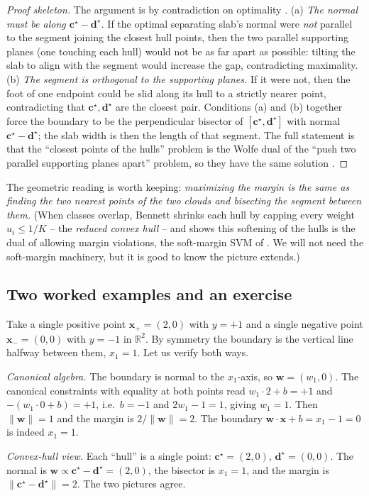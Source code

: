 \begin{proof}[Proof skeleton]
The argument is by contradiction on optimality
\citep{bennett2000}. (a) \emph{The normal must be along
$\mathbf{c}^\star-\mathbf{d}^\star$.} If the optimal separating slab's
normal were \emph{not} parallel to the segment joining the closest hull
points, then the two parallel supporting planes (one touching each hull)
would not be as far apart as possible: tilting the slab to align with the
segment would increase the gap, contradicting maximality. (b) \emph{The
segment is orthogonal to the supporting planes.} If it were not, then the
foot of one endpoint could be slid along its hull to a strictly nearer
point, contradicting that $\mathbf{c}^\star,\mathbf{d}^\star$ are the
closest pair. Conditions (a) and (b) together force the boundary to be the
perpendicular bisector of $[\mathbf{c}^\star,\mathbf{d}^\star]$ with normal
$\mathbf{c}^\star-\mathbf{d}^\star$; the slab width is then the length of
that segment. The full statement is that the ``closest points of the
hulls'' problem is the Wolfe dual of the ``push two parallel supporting
planes apart'' problem, so they have the same solution
\citep{bennett2000}.
\end{proof}

The geometric reading is worth keeping: \emph{maximizing the margin is the
same as finding the two nearest points of the two clouds and bisecting the
segment between them.} (When classes overlap, Bennett shrinks each hull by
capping every weight $u_i\le 1/K$ -- the \emph{reduced convex hull} -- and
shows this softening of the hulls is the dual of allowing margin
violations, the soft-margin SVM of \citet{cortes1995}. We will not need
the soft-margin machinery, but it is good to know the picture extends.)

\subsection{Two worked examples and an exercise}

\begin{example}
\label{ex:twopoint}
Take a single positive point $\mathbf{x}_+ = (2,0)$ with $y=+1$ and a
single negative point $\mathbf{x}_- = (0,0)$ with $y=-1$ in $\mathbb{R}^2$.
By symmetry the boundary is the vertical line halfway between them,
$x_1 = 1$. Let us verify both ways.

\emph{Canonical algebra.} The boundary is normal to the $x_1$-axis, so
$\mathbf{w}=(w_1,0)$. The canonical constraints with equality at both
points read $w_1\cdot 2 + b = +1$ and $-(w_1\cdot 0 + b) = +1$, i.e.\
$b=-1$ and $2w_1 - 1 = 1$, giving $w_1 = 1$. Then $\|\mathbf{w}\| = 1$ and
the margin is $2/\|\mathbf{w}\| = 2$. The boundary
$\mathbf{w}\cdot\mathbf{x}+b = x_1 - 1 = 0$ is indeed $x_1=1$.

\emph{Convex-hull view.} Each ``hull'' is a single point:
$\mathbf{c}^\star=(2,0)$, $\mathbf{d}^\star=(0,0)$. The normal is
$\mathbf{w}\propto\mathbf{c}^\star-\mathbf{d}^\star = (2,0)$, the bisector
is $x_1=1$, and the margin is
$\|\mathbf{c}^\star-\mathbf{d}^\star\| = 2$. The two pictures agree.
\end{example}

